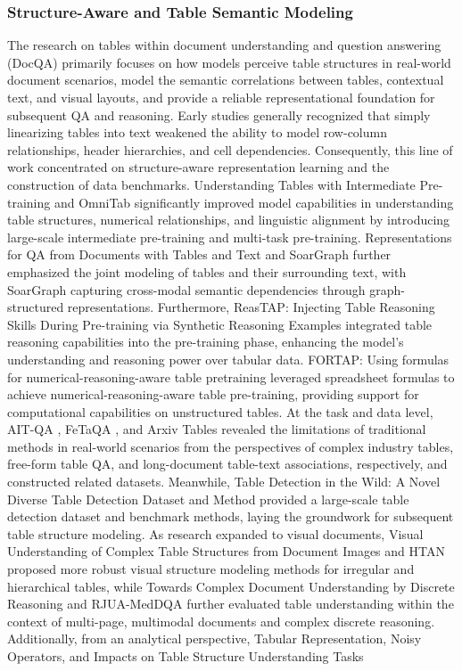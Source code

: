 \subsubsection{Structure-Aware and Table Semantic Modeling}
The research on tables within document understanding and question answering (DocQA) primarily focuses on how models perceive table structures in real-world document scenarios, model the semantic correlations between tables, contextual text, and visual layouts, and provide a reliable representational foundation for subsequent QA and reasoning. Early studies generally recognized that simply linearizing tables into text weakened the ability to model row-column relationships, header hierarchies, and cell dependencies. Consequently, this line of work concentrated on structure-aware representation learning and the construction of data benchmarks. Understanding Tables with Intermediate Pre-training \cite{eisenschlos2020understanding} and OmniTab \cite{jiang2022omnitab} significantly improved model capabilities in understanding table structures, numerical relationships, and linguistic alignment by introducing large-scale intermediate pre-training and multi-task pre-training. Representations for QA from Documents with Tables and Text \cite{zayats2021representations} and SoarGraph \cite{zhu2023soargraph} further emphasized the joint modeling of tables and their surrounding text, with SoarGraph capturing cross-modal semantic dependencies through graph-structured representations. Furthermore, ReasTAP: Injecting Table Reasoning Skills During Pre-training via Synthetic Reasoning Examples \cite{liu2023reastap} integrated table reasoning capabilities into the pre-training phase, enhancing the model's understanding and reasoning power over tabular data. FORTAP: Using formulas for numerical-reasoning-aware table pretraining \cite{cheng2022fortap} leveraged spreadsheet formulas to achieve numerical-reasoning-aware table pre-training, providing support for computational capabilities on unstructured tables. At the task and data level, AIT-QA \cite{katsis2022ait}, FeTaQA \cite{nan2022fetaqa}, and Arxiv Tables \cite{konopka2023arxiv} revealed the limitations of traditional methods in real-world scenarios from the perspectives of complex industry tables, free-form table QA, and long-document table-text associations, respectively, and constructed related datasets. Meanwhile, Table Detection in the Wild: A Novel Diverse Table Detection Dataset and Method \cite{li2021tablewild} provided a large-scale table detection dataset and benchmark methods, laying the groundwork for subsequent table structure modeling. As research expanded to visual documents, Visual Understanding of Complex Table Structures from Document Images \cite{raja2022visual} and HTAN \cite{wu2025htan} proposed more robust visual structure modeling methods for irregular and hierarchical tables, while Towards Complex Document Understanding by Discrete Reasoning \cite{zhu2022towards} and RJUA-MedDQA \cite{jin2024rjua} further evaluated table understanding within the context of multi-page, multimodal documents and complex discrete reasoning. Additionally, from an analytical perspective, Tabular Representation, Noisy Operators, and Impacts on Table Structure Understanding Tasks 